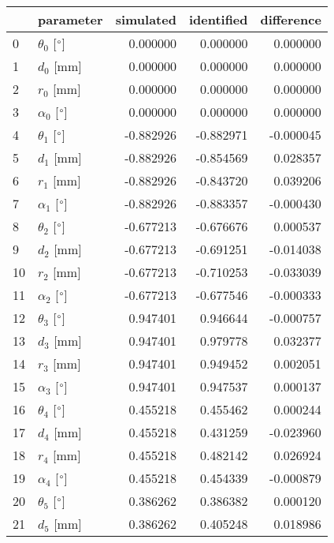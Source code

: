 \documentclass{standalone}%
\begin{document}
%
\normalsize%
\begin{tabular}{llrrr}
\toprule
{} &                 parameter & simulated & identified & difference \\
\midrule
0  &  $\theta_{0}$ [$\degree$] &  0.000000 &   0.000000 &   0.000000 \\
1  &              $d_{0}$ [mm] &  0.000000 &   0.000000 &   0.000000 \\
2  &              $r_{0}$ [mm] &  0.000000 &   0.000000 &   0.000000 \\
3  &  $\alpha_{0}$ [$\degree$] &  0.000000 &   0.000000 &   0.000000 \\
4  &  $\theta_{1}$ [$\degree$] & -0.882926 &  -0.882971 &  -0.000045 \\
5  &              $d_{1}$ [mm] & -0.882926 &  -0.854569 &   0.028357 \\
6  &              $r_{1}$ [mm] & -0.882926 &  -0.843720 &   0.039206 \\
7  &  $\alpha_{1}$ [$\degree$] & -0.882926 &  -0.883357 &  -0.000430 \\
8  &  $\theta_{2}$ [$\degree$] & -0.677213 &  -0.676676 &   0.000537 \\
9  &              $d_{2}$ [mm] & -0.677213 &  -0.691251 &  -0.014038 \\
10 &              $r_{2}$ [mm] & -0.677213 &  -0.710253 &  -0.033039 \\
11 &  $\alpha_{2}$ [$\degree$] & -0.677213 &  -0.677546 &  -0.000333 \\
12 &  $\theta_{3}$ [$\degree$] &  0.947401 &   0.946644 &  -0.000757 \\
13 &              $d_{3}$ [mm] &  0.947401 &   0.979778 &   0.032377 \\
14 &              $r_{3}$ [mm] &  0.947401 &   0.949452 &   0.002051 \\
15 &  $\alpha_{3}$ [$\degree$] &  0.947401 &   0.947537 &   0.000137 \\
16 &  $\theta_{4}$ [$\degree$] &  0.455218 &   0.455462 &   0.000244 \\
17 &              $d_{4}$ [mm] &  0.455218 &   0.431259 &  -0.023960 \\
18 &              $r_{4}$ [mm] &  0.455218 &   0.482142 &   0.026924 \\
19 &  $\alpha_{4}$ [$\degree$] &  0.455218 &   0.454339 &  -0.000879 \\
20 &  $\theta_{5}$ [$\degree$] &  0.386262 &   0.386382 &   0.000120 \\
21 &              $d_{5}$ [mm] &  0.386262 &   0.405248 &   0.018986 \\

\end{tabular}
\end{document}
